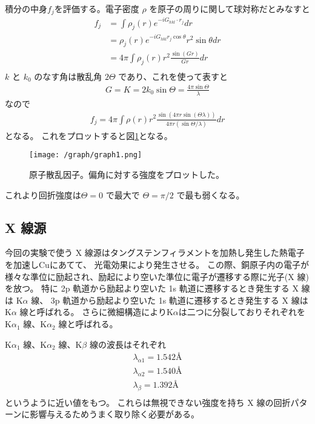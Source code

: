 \documentclass[11pt,dvipdfmx,a4paper]{jsarticle}
\begin{document}
積分の中身\(f_j\)を評価する。電子密度 \(\rho\) を原子の周りに関して球対称だとみなすと
\begin{align}
	f_j &=\int \rho_j(r) e^{-iG_{hkl}\cdot r_j}dr\\
	&= \rho_j(r) e^{-iG_{hkl} r_j \cos\theta}r^2\sin\theta dr\\
	&= 4\pi \int \rho_j(r) r^2 \frac{\sin(Gr)}{Gr}dr\\
\end{align}
\(k\) と \(k_0\) のなす角は散乱角 \(2\Theta\) であり、これを使って表すと
\begin{align}
	G = K = 2k_0\sin\Theta = \frac{4\pi\sin\Theta}{\lambda}
\end{align}
なので
\begin{align}
	f_j  = 4\pi \int \rho(r) r^2 \frac{\sin(4\pi r\sin(\Theta \lambda))}{4\pi r(\sin\Theta/\lambda)} dr
\end{align}
となる。
これをプロットすると図\ref{graph1}となる。
\begin{figure}[h]
	\centering
	\texttt{[image: /graph/graph1.png]}
	\caption{原子散乱因子。偏角に対する強度をプロットした。}
	\label{graph1}
\end{figure}
これより回折強度は\(\Theta = 0\) で最大で \(\Theta = \pi/2\) で最も弱くなる。

\subsection{X 線源}
今回の実験で使う X 線源はタングステンフィラメントを加熱し発生した熱電子を加速しCuにあてて、
光電効果により発生させる。
この際、銅原子内の電子が様々な準位に励起され、励起により空いた準位に電子が遷移する際に光子(X 線)を放つ。
特に
2p 軌道から励起より空いた 1s 軌道に遷移するとき発生する X 線は K\(\alpha\) 線、
3p 軌道から励起より空いた 1s 軌道に遷移するとき発生する X 線は K\(\alpha\) 線と呼ばれる。
さらに微細構造によりK\(\alpha\)は二つに分裂しておりそれぞれを
K\(\alpha_1\) 線、K\(\alpha_2\) 線と呼ばれる。

K\(\alpha_1\) 線、K\(\alpha_2\) 線、K\(\beta\) 線の波長はそれぞれ
\begin{align}
	\lambda_{\alpha1} = 1.542 \text{\AA}\\
	\lambda_{\alpha2} = 1.540 \text{\AA}\\
	\lambda_{\beta} = 1.392 \text{\AA}\\
\end{align}
というように近い値をもつ。\cite{rikanenpyo}
これらは無視できない強度を持ち X 線の回折パターンに影響与えるためうまく取り除く必要がある。
\end{document}
